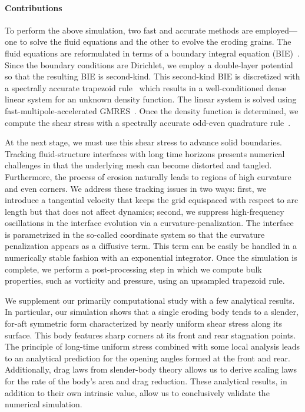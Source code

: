 \documentclass[preprint, 10pt]{elsarticle}
\begin{document}
\paragraph{Contributions}
To perform the above simulation, two fast and accurate methods are employed---one to solve the fluid equations and the other to evolve the eroding grains.  The fluid equations are reformulated in terms of a boundary integral equation (BIE)~\cite{poz1992}.  Since the boundary conditions are Dirichlet, we employ a double-layer potential so that the resulting BIE is second-kind.  This second-kind BIE is discretized with a spectrally accurate trapezoid rule~\cite{tre-wei2014} which results in a well-conditioned dense linear system for an unknown density function. The linear system is solved using fast-multipole-accelerated GMRES~\cite{saa-sch1986}.  Once the density function is determined, we compute the shear stress with a spectrally accurate odd-even quadrature rule~\cite{sid-isr1988}.

At the next stage, we must use this shear stress to advance solid boundaries. Tracking fluid-structure interfaces with long time horizons presents numerical challenges in that the underlying mesh can become distorted and tangled. Furthermore, the process of erosion naturally leads to regions of high curvature and even corners.  We address these tracking issues in two ways: first, we introduce a tangential velocity that keeps the grid equispaced with respect to arc length but that does not affect dynamics; second, we suppress high-frequency oscillations in the interface evolution via a curvature-penalization. The interface is parametrized in the so-called {\thL} coordinate system so that the curvature penalization appears as a diffusive term. This term can be easily be handled in a numerically stable fashion with an exponential integrator. 
Once the simulation is complete, we perform a post-processing step in which we compute bulk properties, such as vorticity and pressure, using an upsampled trapezoid rule.

We supplement our primarily computational study with a few analytical results. In particular, our simulation shows that a single eroding body tends to a slender, for-aft symmetric form characterized by nearly uniform shear stress along its surface. This body features sharp corners at its front and rear stagnation points. The principle of long-time uniform stress combined with some local analysis leads to an analytical prediction for the opening angles formed at the front and rear. Additionally, drag laws from slender-body theory allows us to derive scaling laws for the rate of the body's area and drag reduction. These analytical results, in addition to their own intrinsic value, allow us to conclusively validate the numerical simulation.
\end{document}
